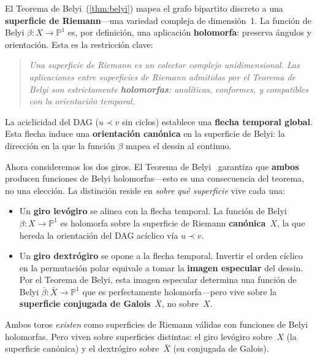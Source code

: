 \documentclass[11pt, a4paper, openany]{book}
\begin{document}
El Teorema de Belyi~(\ref{thm:belyi}) mapea el grafo bipartito
discreto a una \textbf{superficie de Riemann}---una variedad compleja
de dimensi\'on~1. La funci\'on de Belyi $\beta \colon X \to
\mathbb{P}^1$ es, por definici\'on, una aplicaci\'on
\textbf{holomorfa}: preserva \'angulos y orientaci\'on.
Esta es la restricci\'on clave:

\begin{quote}
\itshape
Una superficie de Riemann es un colector complejo unidimensional.
Las aplicaciones entre superficies de Riemann admitidas por el
Teorema de Belyi son estrictamente \textbf{holomorfas}: anal\'iticas,
conformes, y compatibles con la orientaci\'on temporal.
\end{quote}

La aciclicidad del DAG ($u \prec v$ sin ciclos) establece una
\textbf{flecha temporal global}. Esta flecha induce una
\textbf{orientaci\'on can\'onica} en la superficie de Belyi: la
direcci\'on en la que la funci\'on $\beta$ mapea el dessin al
continuo.

Ahora consideremos los dos giros. El Teorema de
Belyi~\cite{belyi1979} garantiza que \textbf{ambos} producen funciones
de Belyi holomorfas---esto es una consecuencia del teorema, no una
elecci\'on. La distinci\'on reside en \emph{sobre qu\'e superficie}
vive cada una:

\begin{itemize}
  \item Un \textbf{giro lev\'ogiro} se alinea con la flecha temporal.
    La funci\'on de Belyi $\beta \colon X \to \mathbb{P}^1$ es holomorfa
    sobre la superficie de Riemann \textbf{can\'onica}~$X$, la que hereda
    la orientaci\'on del DAG ac\'iclico v\'ia $u \prec v$.
  \item Un \textbf{giro dextr\'ogiro} se opone a la flecha temporal.
    Invertir el orden c\'iclico en la permutaci\'on polar equivale a
    tomar la \textbf{imagen especular} del dessin. Por el Teorema de
    Belyi, esta imagen especular determina una funci\'on de Belyi
    $\bar{\beta} \colon \bar{X} \to \mathbb{P}^1$ que es perfectamente
    holomorfa---pero vive sobre la \textbf{superficie conjugada de
    Galois}~$\bar{X}$, no sobre~$X$.
\end{itemize}

\noindent
Ambos toros \emph{existen} como superficies de Riemann v\'alidas con
funciones de Belyi holomorfas. Pero viven sobre superficies distintas:
el giro lev\'ogiro sobre~$X$ (la superficie can\'onica) y el
dextr\'ogiro sobre~$\bar{X}$ (su conjugada de Galois).
\end{document}
